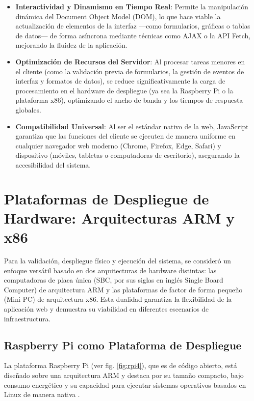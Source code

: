 \begin{itemize}
	\item \textbf{Interactividad y Dinamismo en Tiempo Real}: Permite la
		manipulación dinámica del Document Object Model (DOM), lo que
		hace viable la actualización de elementos de la interfaz —como
		formularios, gráficas o tablas de datos— de forma asíncrona mediante
		técnicas como AJAX o la API Fetch, mejorando la fluidez de la aplicación.

	\item \textbf{Optimización de Recursos del Servidor}: Al procesar tareas
		menores en el cliente (como la validación previa de formularios, la
		gestión de eventos de interfaz y formatos de datos), se reduce
		significativamente la carga de procesamiento en el hardware de
		despliegue (ya sea la Raspberry Pi o la plataforma x86), optimizando
		el ancho de banda y los tiempos de respuesta globales.

	\item \textbf{Compatibilidad Universal}: Al ser el estándar nativo de la
		web, JavaScript garantiza que las funciones del cliente se ejecuten de
		manera uniforme en cualquier navegador web moderno (Chrome, Firefox,
		Edge, Safari) y dispositivo (móviles, tabletas o computadoras de
		escritorio), asegurando la accesibilidad del sistema.
\end{itemize}

\section{Plataformas de Despliegue de Hardware: Arquitecturas ARM y x86}

Para la validación, despliegue físico y ejecución del sistema, se consideró
un enfoque versátil basado en dos arquitecturas de hardware distintas:
las computadoras de placa única (SBC, por sus siglas en inglés Single Board
Computer) de arquitectura ARM y las plataformas de factor de forma
pequeño (Mini PC) de arquitectura x86.  Esta dualidad garantiza la
flexibilidad de la aplicación web y demuestra su viabilidad en diferentes
escenarios de infraestructura.

\subsection{Raspberry Pi como Plataforma de Despliegue}

La plataforma Raspberry Pi (ver fig. \ref{fig:rpi4}),
que es de código abierto, está diseñado
sobre una arquitectura ARM y destaca por su tamaño compacto, bajo
consumo energético y su capacidad para ejecutar sistemas operativos
basados en Linux de manera nativa \parencite{raspberry_pi_2026}.

